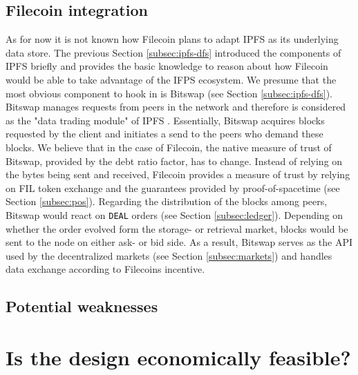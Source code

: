 \documentclass[conference]{IEEEtran}
\begin{document}
\subsection{Filecoin integration}
As for now it is not known how Filecoin plans to adapt IPFS as its underlying data store.
The previous Section \ref{subsec:ipfs-dfs} introduced the components of IPFS briefly and provides the basic knowledge to reason about how Filecoin would be able to take advantage of the IFPS ecosystem.
We presume that the most obvious component to hook in is Bitswap (see Section \ref{subsec:ipfs-dfs}).
Bitswap manages requests from peers in the network and therefore is considered as the "data trading module" of IPFS \cite{bitswap}.
Essentially, Bitswap acquires blocks requested by the client and initiates a send to the peers who demand these blocks.
We believe that in the case of Filecoin, the native measure of trust of Bitswap, provided by the debt ratio factor, has to change.
Instead of relying on the bytes being sent and received, Filecoin provides a measure of trust by relying on FIL token exchange and the guarantees provided by proof-of-spacetime (see Section \ref{subsec:pos}).
Regarding the distribution of the blocks among peers, Bitswap would react on \texttt{DEAL} orders (see Section \ref{subsec:ledger}).
Depending on whether the order evolved form the storage- or retrieval market, blocks would be sent to the node on either ask- or bid side.
As a result, Bitswap serves as the API used by the decentralized markets (see Section \ref{subsec:markets}) and handles data exchange according to Filecoins incentive.

\subsection{Potential weaknesses}
 
\section{Is the design economically feasible?}
\label{sec:eco-feasibility}
\end{document}
